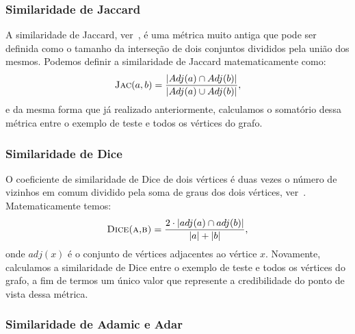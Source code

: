 \subsubsection{Similaridade de Jaccard}
\label{subsubsection::jaccard}

A similaridade de Jaccard, ver~\cite{Jaccard01}, é uma métrica muito antiga que pode ser definida como o tamanho da interseção de dois conjuntos divididos pela união dos mesmos. Podemos definir a similaridade de Jaccard matematicamente como:
\begin{equation}
\textsc{Jac}(a, b) =  \frac{|Adj(a) \cap Adj(b)|}{|Adj(a) \cup Adj(b)|},
\end{equation}
e da mesma forma que já realizado anteriormente, calculamos o somatório dessa métrica entre o exemplo de teste e todos os vértices do grafo.


\subsubsection{Similaridade de Dice}
\label{subsubsection::dice}

O coeficiente de similaridade de Dice de dois vértices é duas vezes o número de vizinhos em comum dividido pela soma de graus dos dois vértices, ver~\cite{Dice45}. Matematicamente temos:
\begin{equation}
\textsc{Dice(a,b)} = \frac{2 \cdot | adj(a) \cap adj(b) | }{| a | + | b |},
\end{equation}
onde $adj(x)$ é o conjunto de vértices adjacentes ao vértice $x$. Novamente, calculamos a similaridade de Dice entre o exemplo de teste e todos os vértices do grafo, a fim de termos um único valor que represente a credibilidade do ponto de vista dessa métrica.

\subsubsection{ Similaridade de Adamic e Adar}
\label{subsubsection::inverselog}

